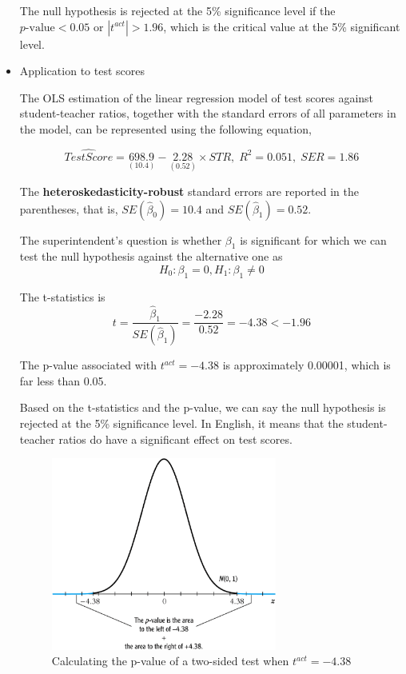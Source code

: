 \documentclass[a4paper,11pt]{article}
\begin{document}
\begin{itemize}
The null hypothesis is rejected at the 5\% significance level if the
\(p\text{-value} < 0.05\) or \(|t^{act}| > 1.96\), which is the critical
value at the 5\% significant level. 

\item Application to test scores
\label{sec:orgfbd8a8c}

The OLS estimation of the linear regression model of test scores
against student-teacher ratios, together with the standard errors of
all parameters in the model, can be represented using the following
equation, 
\begin{LaTeX}
\begin{equation*}
\widehat{TestScore} = \underset{\displaystyle (10.4)}{698.9} - \underset{\displaystyle (0.52)}{2.28} \times STR,\; R^2 = 0.051,\; SER = 1.86
\end{equation*}
\end{LaTeX}

The \textbf{heteroskedasticity-robust} standard errors are reported in the
parentheses, that is, \(SE(\hat{\beta}_0) = 10.4\) and
\(SE(\hat{\beta}_1) = 0.52\). 

The superintendent's question is whether \(\beta_1\) is significant for
which we can test the null hypothesis against the alternative one as
\[ H_0: \beta_1 = 0, H_1: \beta_1 \neq 0 \]

The t-statistics is
\[ t = \frac{\hat{\beta}_1}{SE(\hat{\beta}_1)} = \frac{-2.28}{0.52}
= -4.38 < -1.96 \] 

The p-value associated with \(t^{act} = -4.38\) is approximately
0.00001, which is far less than 0.05. 

Based on the t-statistics and the p-value, we can say the null
hypothesis is rejected at the 5\% significance level. In English, it
means that the student-teacher ratios do have a significant effect on
test scores. 

\begin{figure}[htbp]
\centering
\includegraphics[width=0.7\textwidth]{figure/fig-5-1.png}
\caption{\label{fig:orgc041c8e}
Calculating the p-value of a two-sided test when \(t^{act}=-4.38\)}
\end{figure}
\end{itemize}
\end{document}
